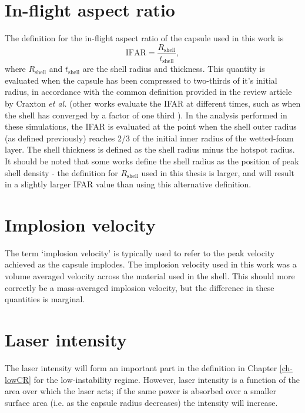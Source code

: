 \section{In-flight aspect ratio}

The definition for the in-flight aspect ratio of the capsule used in this work is \begin{equation} \mathrm{IFAR} = \frac{R_\mathrm{shell}}{t_\mathrm{shell}}, \end{equation}
where $R_\mathrm{shell}$ and $t_\mathrm{shell}$ are the shell radius and thickness. This quantity is evaluated when the capsule has been compressed to two-thirds of it's initial radius, in accordance with the common definition provided in the review article by Craxton \textit{et al.} \cite{Craxton2015} (other works evaluate the IFAR at different times, such as when the shell has converged by a factor of one third \cite{Radha2011}). In the analysis performed in these simulations, the IFAR is evaluated at the point when the shell outer radius (as defined previously) reaches 2/3 of the initial inner radius of the wetted-foam layer. The shell thickness is defined as the shell radius minus the hotspot radius. It should be noted that some works define the shell radius as the position of peak shell density - the definition for $R_\mathrm{shell}$ used in this thesis is larger, and will result in a slightly larger IFAR value than using this alternative definition.

\section{Implosion velocity}

The term `implosion velocity' is typically used to refer to the peak velocity achieved as the capsule implodes. The implosion velocity used in this work was a volume averaged velocity across the material used in the shell. This should more correctly be a mass-averaged implosion velocity, but the difference in these quantities is marginal. 

\section{Laser intensity}

The laser intensity will form an important part in the definition in Chapter \ref{ch-lowCR} for the low-instability regime. However, laser intensity is a function of the area over which the laser acts; if the same power is absorbed over a smaller surface area (i.e. as the capsule radius decreases) the intensity will increase.

